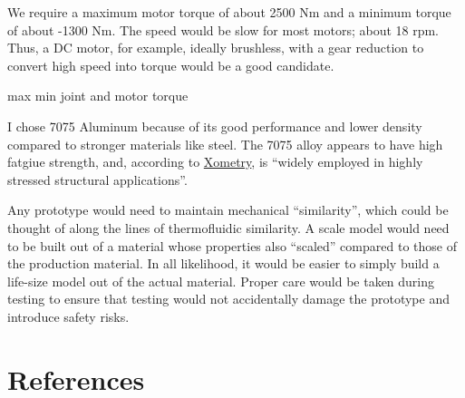 \documentclass[12pt]{article}
\begin{document}
We require a maximum motor torque of about 2500 Nm and a minimum torque of about -1300 Nm. The speed would be slow for most motors; about 18 rpm. Thus, a DC motor, for example, ideally brushless, with a gear reduction to convert high speed into torque would be a good candidate.

max min joint and motor torque

I chose 7075 Aluminum because of its good performance and lower density compared to stronger materials like steel. The 7075 alloy appears to have high fatgiue strength, and, according to \href{https://www.xometry.com/resources/materials/7075-aluminum-alloy/#:~:text=7075%20aluminum%20employs%20a%20high%20zinc%20content,is%20quite%20susceptible%20to%20embrittlement%20because%20of}{Xometry}, is ``widely employed in highly stressed structural applications''.

Any prototype would need to maintain mechanical ``similarity'', which could be thought of along the lines of thermofluidic similarity. A scale model would need to be built out of a material whose properties also ``scaled'' compared to those of the production material. In all likelihood, it would be easier to simply build a life-size model out of the actual material. Proper care would be taken during testing to ensure that testing would not accidentally damage the prototype and introduce safety risks.

\section{References}%
\label{ref}
\end{document}
